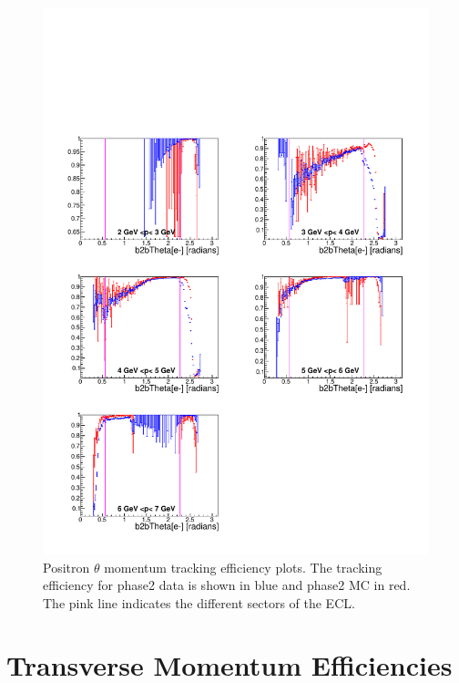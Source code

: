\documentclass[a4paper,11pt,twosided,final,german,openbib,pdftex,listof=totoc,bibliography=totoc]{scrbook}
\begin{document}
\begin{figure}[!htbp]
	\centering
	\includegraphics[width=\textwidth]{Plots/master/xPMThetaep}
	\caption[Momentum $\theta$ Positron Efficiency Phase2]{Positron $\theta$ momentum tracking efficiency plots. The tracking efficiency for phase2 data is shown in blue and phase2 MC in red. The pink line indicates the different sectors of the ECL.}
	\label{plt:xPMThetaep}
\end{figure}



\clearpage

\newpage




\section{Transverse Momentum Efficiencies}
\end{document}
